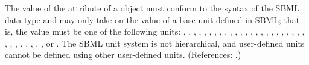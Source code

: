 The value of the attribute  of a \Unit object must conform to
the syntax of the SBML data type  and may only take on
the value of a base unit defined in SBML; that is, the value must be one of
the following units:
,
,
,
,
,
,
,
,
,
,
,
,
,
,
,
,
,
,
,
,
,
,
,
,
,
,
,
,
,
,
,
, or
.
The SBML unit system is not hierarchical, and user-defined units cannot be
defined using other user-defined units.  (References: .)

